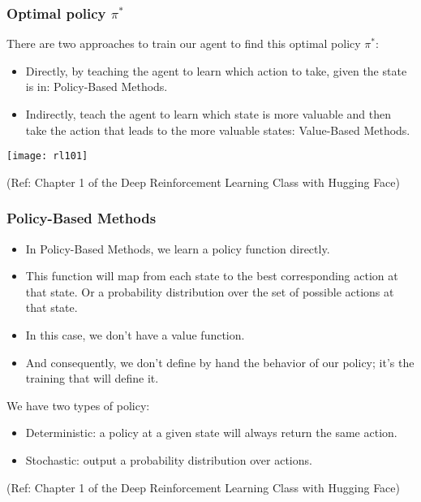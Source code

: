 \begin{frame}[fragile]\frametitle{Optimal policy $\pi^*$}

There are two approaches to train our agent to find this optimal policy  $\pi^*$:

\begin{itemize}
\item Directly, by teaching the agent to learn which action to take, given the state is in: Policy-Based Methods.
\item Indirectly, teach the agent to learn which state is more valuable and then take the action that leads to the more valuable states: Value-Based Methods.
\end{itemize}

\begin{center}
\texttt{[image: rl101]}
\end{center}



{\tiny (Ref: Chapter 1 of the Deep Reinforcement Learning Class with Hugging Face)}


\end{frame}

\begin{frame}[fragile]\frametitle{Policy-Based Methods}

\begin{itemize}
\item In Policy-Based Methods, we learn a policy function directly.
\item This function will map from each state to the best corresponding action at that state. Or a probability distribution over the set of possible actions at that state.
\item  In this case, we don't have a value function.
\item And consequently, we don't define by hand the behavior of our policy; it's the training that will define it.
\end{itemize}

We have two types of policy:
\begin{itemize}
\item Deterministic: a policy at a given state will always return the same action.
\item Stochastic: output a probability distribution over actions.
\end{itemize}

{\tiny (Ref: Chapter 1 of the Deep Reinforcement Learning Class with Hugging Face)}


\end{frame}

